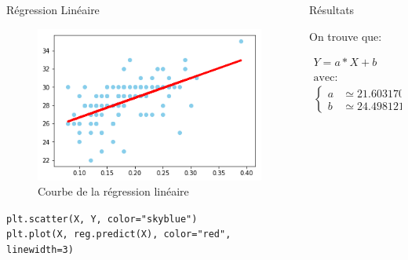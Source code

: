 \documentclass[final]{beamer}
\newlength{\onecolwid}
\newlength{\twocolwid}
\begin{document}
\begin{frame}[t]
\begin{columns}[t]
\begin{column}{\twocolwid}
\begin{columns}[t,totalwidth=\twocolwid]
\begin{column}{\onecolwid}
\begin{block}{Régression Linéaire}
\begin{figure}
\includegraphics[width=0.8\linewidth]{figure.png}
\caption{Courbe de la régression linéaire}
\end{figure}


\vspace*{1em}

\texttt{plt.scatter(X, Y, color="skyblue")\\
plt.plot(X, reg.predict(X), color="red", linewidth=3)}

\end{block}


\end{column} %

\begin{column}{\onecolwid} %


\begin{block}{Résultats}


On trouve que:

\begin{align*}
    Y = a * X + b\\\\
    \text{avec:}\\
    \begin{cases}
        a &\simeq21.60317093 \\
        b &\simeq24.49812184 
    \end{cases}
\end{align*}


\end{block}
\end{column}
\end{columns}
\end{column}
\end{columns}
\end{frame}
\end{document}
